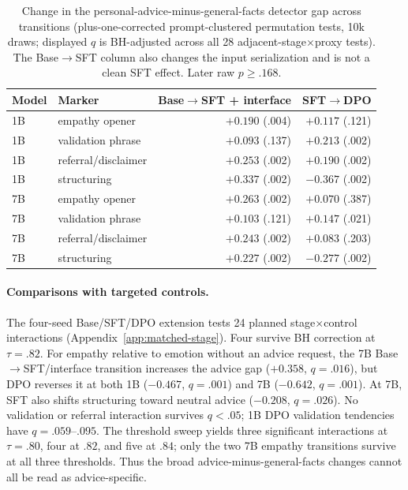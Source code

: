 \documentclass[11pt]{article}
\begin{document}
\begin{table}[t]
\centering
\small
\setlength{\tabcolsep}{1.5pt}
\begin{tabular}{@{}llrr@{}}
\toprule
Model & Marker & \shortstack{Base$\to$SFT\\+ interface} &
SFT$\to$DPO \\
\midrule
1B & empathy opener & $+0.190$ (.004) & $+0.117$ (.121) \\
1B & validation phrase & $+0.093$ (.137) & $+0.213$ (.002) \\
1B & referral/disclaimer & $+0.253$ (.002) & $+0.190$ (.002) \\
1B & structuring & $+0.337$ (.002) & $-0.367$ (.002) \\
\midrule
7B & empathy opener & $+0.263$ (.002) & $+0.070$ (.387) \\
7B & validation phrase & $+0.103$ (.121) & $+0.147$ (.021) \\
7B & referral/disclaimer & $+0.243$ (.002) & $+0.083$ (.203) \\
7B & structuring & $+0.227$ (.002) & $-0.277$ (.002) \\
\bottomrule
\end{tabular}
\caption{Change in the personal-advice-minus-general-facts detector gap across transitions
(plus-one-corrected prompt-clustered permutation tests, 10k draws; displayed
$q$ is BH-adjusted across all 28 adjacent-stage$\times$proxy tests). The
Base$\to$SFT column also changes the input serialization and is not a clean SFT
effect. Later raw $p\geq.168$.}
\label{tab:interaction}
\end{table}

\paragraph{Comparisons with targeted controls.} The four-seed
Base/SFT/DPO extension tests 24 planned stage$\times$control interactions
(Appendix~\ref{app:matched-stage}). Four survive BH correction at $\tau=.82$.
For empathy relative to emotion without an advice request, the 7B Base$\to$SFT/interface
transition increases the advice gap
($+0.358$, $q=.016$), but DPO reverses it at both 1B ($-0.467$, $q=.001$) and
7B ($-0.642$, $q=.001$). At 7B, SFT also shifts structuring toward neutral
advice ($-0.208$, $q=.026$). No validation or referral interaction survives
$q<.05$; 1B DPO validation tendencies have $q=.059$--$.095$. The threshold
sweep yields three significant interactions at $\tau=.80$, four at $.82$, and
five at $.84$; only the two 7B
empathy transitions survive at all three thresholds. Thus the broad
advice-minus-general-facts changes cannot all be read as advice-specific.
\end{document}
